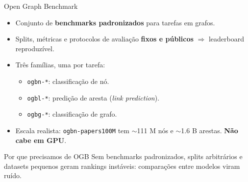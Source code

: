 \documentclass[aspectratio=169,xcolor=dvipsnames]{beamer}
\begin{document}
  \begin{frame}{Open Graph Benchmark}
    \begin{itemize}
      \item Conjunto de \textbf{benchmarks padronizados} para tarefas em grafos.
      \item Splits, métricas e protocolos de avaliação \textbf{fixos e públicos}
            $\Rightarrow$ leaderboard reproduzível.
      \item Três famílias, uma por tarefa:
        \begin{itemize}
          \item \texttt{ogbn-*}: classificação de nó.
          \item \texttt{ogbl-*}: predição de aresta (\textit{link prediction}).
          \item \texttt{ogbg-*}: classificação de grafo.
        \end{itemize}
      \item Escala realista: \texttt{ogbn-papers100M} tem $\sim$111 M nós e
            $\sim$1.6 B arestas. \textbf{Não cabe em GPU}.
    \end{itemize}

    \vspace{0.5em}
    \begin{block}{Por que precisamos de OGB}
      Sem benchmarks padronizados, splits arbitrários e datasets pequenos geram
      rankings instáveis: comparações entre modelos viram ruído.
    \end{block}
  \end{frame}
\end{document}

